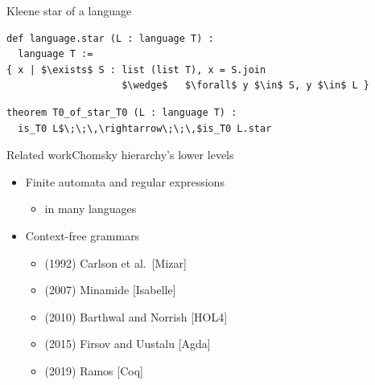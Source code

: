\documentclass{beamer}
\begin{document}
	\begin{frame}[fragile]{Kleene star of a language}
\begin{lstlisting}
def language.star (L : language T) :
  language T :=
{ x | $\exists$ S : list (list T), x = S.join
                    $\wedge$   $\forall$ y $\in$ S, y $\in$ L }
\end{lstlisting}
\pause
\begin{lstlisting}
theorem T0_of_star_T0 (L : language T) :
  is_T0 L$\;\;\,\rightarrow\;\;\,$is_T0 L.star
\end{lstlisting}
	\end{frame}
	
	\begin{frame}{Related work}{Chomsky hierarchy's lower levels}
		\begin{itemize}
			\item Finite automata and regular expressions
			\begin{itemize}
				\item in many languages
			\end{itemize}
			\item Context-free grammars
			\begin{itemize}
				\item (1992) Carlson et al.\ [Mizar]
				\item (2007) Minamide [Isabelle]
				\item (2010) Barthwal and Norrish [HOL4]
				\item (2015) Firsov and Uustalu [Agda]
				\item (2019) Ramos [Coq]
			\end{itemize}
		\end{itemize}
	\end{frame}
	
\end{document}
